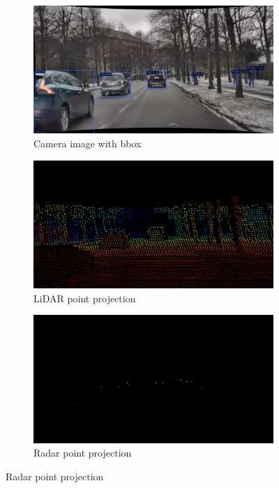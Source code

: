 \documentclass[report.tex]{subfiles}
\begin{document}
    \begin{figure}[ht]
        \centering
        \begin{subfigure}{0.3\textwidth}
            \centering
            \includegraphics[width=\linewidth]{images/methods/mtdetr/2018-02-06_15-58-05_00000.png}
            \caption{Camera image with bbox}
            \label{fig:camera_image_mtdetr}
        \end{subfigure}
        \hfill
        \begin{subfigure}{0.3\textwidth}
            \centering
            \includegraphics[width=\linewidth]{images/methods/mtdetr/2018-02-06_15-58-05_00000_LiDAR.png}
            \caption{LiDAR point projection}
            \label{fig:LiDAR_cam_mtdetr}
        \end{subfigure}
        \hfill
        \begin{subfigure}{0.3\textwidth}
            \centering
            \includegraphics[width=\linewidth]{images/methods/mtdetr/2018-02-06_15-58-05_00000_Radar.png}
            \caption{Radar point projection}
            \label{fig:Radar_cam_mtdetr}
        \end{subfigure}
    

\end{figure}
\end{document}
